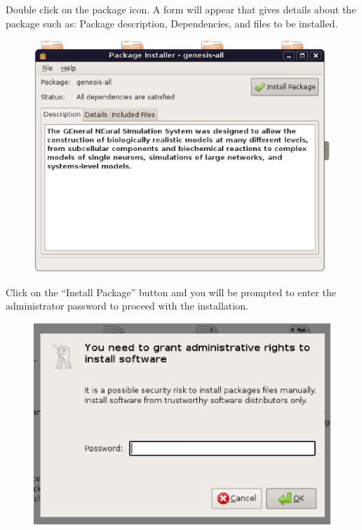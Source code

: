 \documentclass[12pt]{article}
\begin{document}
Double click on the package icon. A form will appear that gives details about the package such as: Package description, Dependencies, and files to be installed.

\begin{figure}[h]
   \centering
   \includegraphics[scale=0.5]{figures/install-user-deb-pkg.eps}
\end{figure}

\newpage

Click on the ``{\sf Install Package}'' button and you will be prompted to enter the administrator password to proceed with the installation.

\begin{figure}[h]
   \centering
   \includegraphics[scale=0.5]{figures/install-user-deb-admin.eps}
\end{figure}
\end{document}
